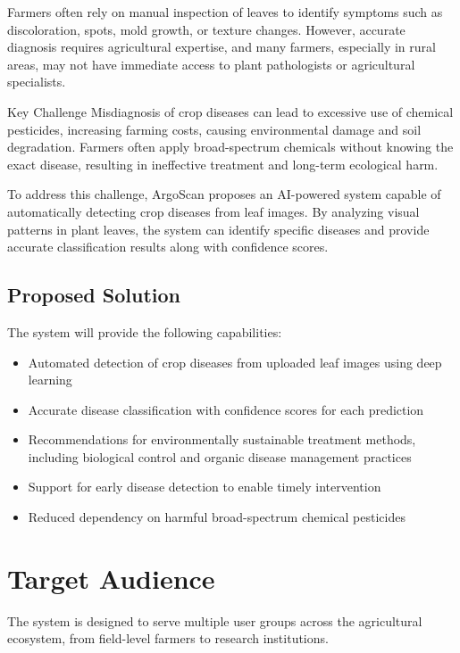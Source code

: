 \documentclass[12pt,a4paper]{article}
\begin{document}
Farmers often rely on manual inspection of leaves to identify symptoms such as discoloration, spots, mold growth, or texture changes. However, accurate diagnosis requires agricultural expertise, and many farmers, especially in rural areas, may not have immediate access to plant pathologists or agricultural specialists.

\begin{keybox}{Key Challenge}
Misdiagnosis of crop diseases can lead to excessive use of chemical pesticides, increasing farming costs, causing environmental damage and soil degradation. Farmers often apply broad-spectrum chemicals without knowing the exact disease, resulting in ineffective treatment and long-term ecological harm.
\end{keybox}

To address this challenge, ArgoScan proposes an AI-powered system capable of automatically detecting crop diseases from leaf images. By analyzing visual patterns in plant leaves, the system can identify specific diseases and provide accurate classification results along with confidence scores.

\subsection{Proposed Solution}

The system will provide the following capabilities:

\begin{itemize}[leftmargin=*, itemsep=5pt]
  \item Automated detection of crop diseases from uploaded leaf images using deep learning
  \item Accurate disease classification with confidence scores for each prediction
  \item Recommendations for environmentally sustainable treatment methods, including biological control and organic disease management practices
  \item Support for early disease detection to enable timely intervention
  \item Reduced dependency on harmful broad-spectrum chemical pesticides
\end{itemize}

\section{Target Audience}

The system is designed to serve multiple user groups across the agricultural ecosystem, from field-level farmers to research institutions.
\end{document}

